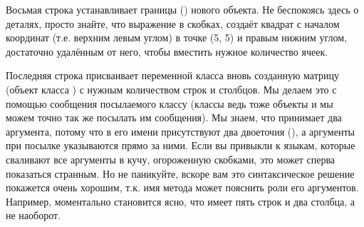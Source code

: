 \documentclass[a4paper,10pt,twoside]{book}
\begin{document}
{%

Восьмая строка устанавливает границы () нового объекта.
Не беспокоясь здесь о деталях, просто знайте, что выражение в скобках, создаёт квадрат с началом координат (т.е. верхним левым углом) в точке (5, 5) и правым нижним углом, достаточно удалённым от него, чтобы вместить нужное количество ячеек.

Последняя строка присваивает переменной  класса  вновь созданную матрицу (объект класса ) с нужным количеством строк и столбцов. Мы делаем это с помощью сообщения  посылаемого классу  (классы ведь тоже объекты и мы можем точно так же посылать им сообщения). Мы знаем, что  принимает два аргумента, потому что в его имени присутствуют два двоеточия (\ct{:}), а аргументы при посылке указываются прямо за ними.
Если вы привыкли к языкам, которые сваливают все аргументы в кучу, огороженную скобками, это может сперва показаться странным. Но не паникуйте,
вскоре вам это синтаксическое решение покажется очень хорошим, т.к. имя метода может пояснить роли его аргументов. Например, моментально становится ясно, что  имеет пять строк и два столбца, а не наоборот.

}
\end{document}
